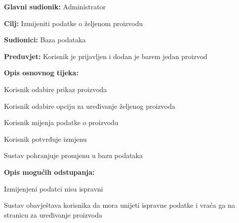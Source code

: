 					\noindent {}
					\begin{packed_item}
						
						\item \textbf{Glavni sudionik:} Administrator
						\item  \textbf{Cilj:} Izmijeniti podatke o željenom proizvodu
						\item  \textbf{Sudionici:} Baza podataka
						\item  \textbf{Preduvjet:} Korisnik je prijavljen i dodan je barem jedan proizvod
						\item  \textbf{Opis osnovnog tijeka:}
						
						\item[] \begin{packed_enum}
							
							\item Korisnik odabire prikaz proizvoda
							\item Korisnik odabire opciju za uređivanje željenog proizvoda
							\item Korisnik mijenja podatke o proizvodu
							\item Korisnik potvrđuje izmjenu
							\item Sustav pohranjuje promjenu u bazu podataka
							
						\end{packed_enum}
						
						\item  \textbf{Opis mogućih odstupanja:}
						
						\item[] \begin{packed_item}
							
							\item[4.a] Izmijenjeni podatci nisu ispravni 
							\item[] \begin{packed_enum}
								
								\item Sustav obavještava korisnika da mora unijeti ispravne podatke i vraća ga na stranicu za uređivanje proizvoda
								
							\end{packed_enum}
							
						\end{packed_item}	
						
					\end{packed_item}
				
